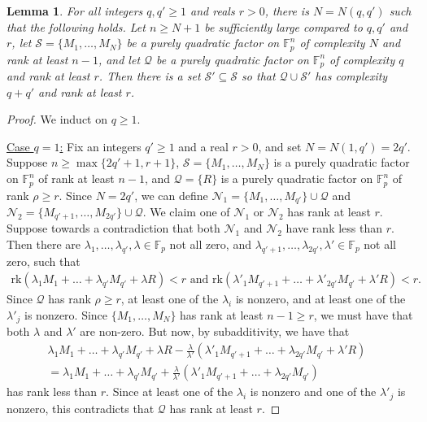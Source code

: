 \documentclass[12pt,oneside,british,a4wide]{amsart}
\newtheorem{lemma}[theorem]{Lemma}
\numberwithin{equation}{section}
\theoremstyle{definition}
\def\F{\mathbb{F}}
\newcommand{\calN}{\mathcal{N}}
\newcommand{\calQ}{\mathcal{Q}}
\newcommand{\calS}{\mathcal{S}}
\newcommand{\rk}{{\mathrm{rk}}}
\begin{document}
\begin{lemma}\label{lem:paddingrestate}
For all integers $q,q'\geq 1$ and reals $r>0$, there is $N=N(q,q')$ such that the following holds.  Let $n\geq N+1$ be sufficiently large compared to $q,q'$ and $r$, let $\calS=\{M_1,\ldots, M_{N}\}$ be a purely quadratic factor on $\F_p^n$ of complexity $N$ and rank at least $n-1$, and let $\calQ$ be a purely quadratic factor on $\F_p^n$ of complexity $q$ and rank at least $r$.  Then there is a set $\calS'\subseteq \calS$ so that $\calQ\cup \calS'$ has complexity $q+q'$ and rank at least $r$.
\end{lemma}
\begin{proof}
We induct on $q\geq 1$.

\underline{Case $q=1$:}  Fix an integers $q'\geq 1$ and a real $r>0$, and set $N=N(1,q')=2q'$.  Suppose $n\geq \max\{2q'+1,r+1\}$,  $\calS=\{M_1,\ldots, M_{N}\}$ is a purely quadratic factor on $\F_p^n$ of rank at least $n-1$, and $\calQ=\{R\}$ is a purely quadratic factor on $\F_p^n$ of rank $\rho\geq r$. Since $N=2q'$, we can define $\calN_1=\{M_1,\ldots, M_{q'}\}\cup \calQ$ and $\calN_2=\{M_{q'+1},\ldots, M_{2q'}\}\cup \calQ$. We claim one of $\calN_1$ or $\calN_2$ has rank at least $r$.    Suppose towards a contradiction that both $\calN_1$ and $\calN_2$ have rank less than $r$.  Then there are $\lambda_1,\ldots, \lambda_{q'},\lambda\in \F_p$  not all zero, and $\lambda_{q'+1},\ldots, \lambda_{2q'},\lambda'\in \F_p$  not all zero, such that 
\begin{align*}
\rk(\lambda_1 M_1+\ldots +\lambda_{q'}M_{q'}+\lambda R)<r\text{ and }\rk(\lambda'_1 M_{q'+1}+\ldots +\lambda'_{2q'}M_{q'}+\lambda' R)<r.
\end{align*}
Since $\calQ$ has rank $\rho\geq r$, at least one of the $\lambda_i$ is nonzero,  and at least one of the $\lambda'_j$ is nonzero.  Since $\{M_1,\ldots, M_{N}\}$ has rank at least $n-1\geq r$, we must have that both $\lambda$ and $\lambda'$ are non-zero.  But now, by subadditivity, we have that
\begin{align*}
\lambda_1 M_1+\ldots +\lambda_{q'}M_{q'}+\lambda R-\frac{\lambda}{\lambda'}(\lambda'_1 M_{q'+1}+\ldots +\lambda_{2q'}M_{q'}+\lambda' R)&\\
=\lambda_1 M_1+\ldots +\lambda_{q'}M_{q'}+\frac{\lambda}{\lambda'}(\lambda'_1 M_{q'+1}+\ldots +\lambda_{2q'}M_{q'})&
\end{align*}
has rank less than $r$. Since at least one of the $\lambda_i$ is nonzero  and one of the $\lambda'_j$ is nonzero,  this contradicts that $\calQ$ has rank at least $r$.


\end{proof}
\end{document}
